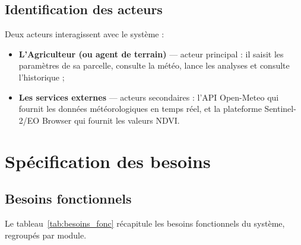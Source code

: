 \subsection{Identification des acteurs}

Deux acteurs interagissent avec le système :

\begin{itemize}[leftmargin=1.2cm]
	\item \textbf{L'Agriculteur (ou agent de terrain)} --- acteur
	principal : il saisit les paramètres de sa parcelle,
	consulte la météo, lance les analyses et consulte
	l'historique ;
	\item \textbf{Les services externes} --- acteurs secondaires :
	l'API Open-Meteo qui fournit les données météorologiques
	en temps réel, et la plateforme Sentinel-2/EO Browser qui
	fournit les valeurs NDVI.
\end{itemize}

\section{Spécification des besoins}
\label{sec:besoins}

\subsection{Besoins fonctionnels}

Le tableau~\ref{tab:besoins_fonc} récapitule les besoins
fonctionnels du système, regroupés par module.

